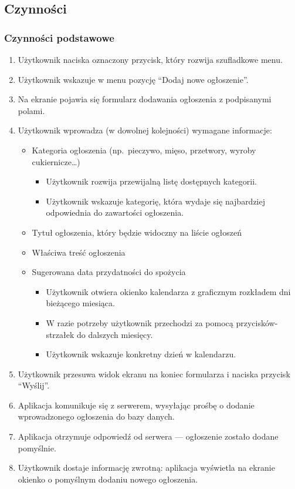 \documentclass[12pt,a4paper,twoside]{article}
\begin{document}
    \subsection{Czynności}


    \subsubsection{Czynności podstawowe}


    \begin{enumerate}
        \item Użytkownik naciska oznaczony przycisk, który rozwija szufladkowe menu.
        \item Użytkownik wskazuje w menu pozycję ``Dodaj nowe ogłoszenie''.
        \item Na ekranie pojawia się formularz dodawania ogłoszenia z podpisanymi polami.
        \item Użytkownik wprowadza (w dowolnej kolejności) wymagane informacje:
        \begin{itemize}
            \item Kategoria ogłoszenia (np.\ pieczywo, mięso, przetwory, wyroby cukiernicze\ldots)
            \begin{itemize}
                \item Użytkownik rozwija przewijalną listę dostępnych kategorii.
                \item Użytkownik wskazuje kategorię, która wydaje się najbardziej odpowiednia do zawartości ogłoszenia.
            \end{itemize}
            \item Tytuł ogłoszenia, który będzie widoczny na liście ogłoszeń
            \item Właściwa treść ogłoszenia
            \item Sugerowana data przydatności do spożycia
            \begin{itemize}
                \item Użytkownik otwiera okienko kalendarza z graficznym rozkładem dni bieżącego miesiąca.
                \item W razie potrzeby użytkownik przechodzi za pomocą przycisków-strzałek do dalszych miesięcy.
                \item Użytkownik wskazuje konkretny dzień w kalendarzu.
            \end{itemize}
        \end{itemize}
        \item Użytkownik przesuwa widok ekranu na koniec formularza i naciska przycisk ``Wyślij''.
        \item Aplikacja komunikuje się z serwerem, wysyłając prośbę o dodanie wprowadzonego ogłoszenia do bazy danych.
        \item Aplikacja otrzymuje odpowiedź od serwera --- ogłoszenie zostało dodane pomyślnie.
        \item Użytkownik dostaje informację zwrotną: aplikacja wyświetla na ekranie okienko o pomyślnym dodaniu nowego ogłoszenia.
    \end{enumerate}
\end{document}
